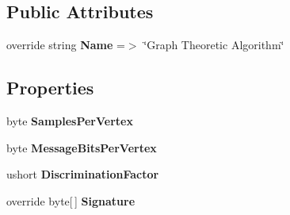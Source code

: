 \subsection*{Public Attributes}
\begin{DoxyCompactItemize}
\item 
override string {\bfseries Name} =$>$ \char`\"{}Graph Theoretic Algorithm\char`\"{}\hypertarget{class_stegosaurus_1_1_algorithm_1_1_graph_theoretic_algorithm_acfbd5778ddcb9cac2444625112727964}{}\label{class_stegosaurus_1_1_algorithm_1_1_graph_theoretic_algorithm_acfbd5778ddcb9cac2444625112727964}

\end{DoxyCompactItemize}
\subsection*{Properties}
\begin{DoxyCompactItemize}
\item 
byte {\bfseries Samples\+Per\+Vertex}\hypertarget{class_stegosaurus_1_1_algorithm_1_1_graph_theoretic_algorithm_ab38113ed035bddf4d1ce6e9df5d3e2df}{}\label{class_stegosaurus_1_1_algorithm_1_1_graph_theoretic_algorithm_ab38113ed035bddf4d1ce6e9df5d3e2df}

\item 
byte {\bfseries Message\+Bits\+Per\+Vertex}\hypertarget{class_stegosaurus_1_1_algorithm_1_1_graph_theoretic_algorithm_ab0c79fe6225f3b8e440945f2c45b895b}{}\label{class_stegosaurus_1_1_algorithm_1_1_graph_theoretic_algorithm_ab0c79fe6225f3b8e440945f2c45b895b}

\item 
ushort {\bfseries Discrimination\+Factor}\hypertarget{class_stegosaurus_1_1_algorithm_1_1_graph_theoretic_algorithm_a93a75dad5e07d8887e92234fd83f3b99}{}\label{class_stegosaurus_1_1_algorithm_1_1_graph_theoretic_algorithm_a93a75dad5e07d8887e92234fd83f3b99}

\item 
override byte\mbox{[}$\,$\mbox{]} {\bfseries Signature}\hypertarget{class_stegosaurus_1_1_algorithm_1_1_graph_theoretic_algorithm_ace57fbacebb4b718c842e750279789c9}{}\label{class_stegosaurus_1_1_algorithm_1_1_graph_theoretic_algorithm_ace57fbacebb4b718c842e750279789c9}

\end{DoxyCompactItemize}
